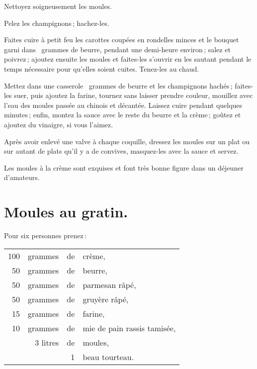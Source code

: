 Nettoyez soigneusement les moules.

Pelez les champignons ; hachez-les.

Faites cuire à petit feu les carottes coupées en rondelles minces et le bouquet
garni dans {\mmm} grammes de beurre, pendant une demi-heure environ ; salez et
poivrez ; ajoutez ensuite les moules et faites-les s'ouvrir en les sautant
pendant le temps nécessaire pour qu'elles soient cuites. Tenez-les au chaud.

Mettez dans une casserole {\mmm} grammes de beurre et les champignons hachés ;
faites-les suer, puis ajoutez la farine, tournez sans laisser prendre couleur,
mouillez avec l’eau des moules passée au chinois et décantée. Laissez cuire
pendant quelques minutes ; enfin, montez la sauce avec le reste du beurre et la
crème ; goûtez et ajoutez du vinaigre, si vous l'aimez.

Après avoir enlevé une valve à chaque coquille, dressez les moules sur un plat
ou sur autant de plats qu'il y a de convives, masquez-les avec la sauce et
servez.

Les moules à la crème sont exquises et font très bonne figure dans un déjeuner
d'amateurs.

\section*{\centering Moules au gratin.}

Pour six personnes prenez :

\medskip

\footnotesize
\begin{longtable}{rrrp{16em}}
    100 & grammes  & de & crème,                                                                          \\
     50 & grammes  & de & beurre,                                                                         \\
     50 & grammes  & de & parmesan râpé,                                                                  \\
     50 & grammes  & de & gruyère râpé,                                                                   \\
     15 & grammes  & de & farine,                                                                         \\
      10& grammes  & de & mie de pain rassis tamisée,                                                     \\
        & 3 litres & de & moules,                                                                         \\
        &          &  1 & beau tourteau.                                                                  \\
\end{longtable}
\normalsize

